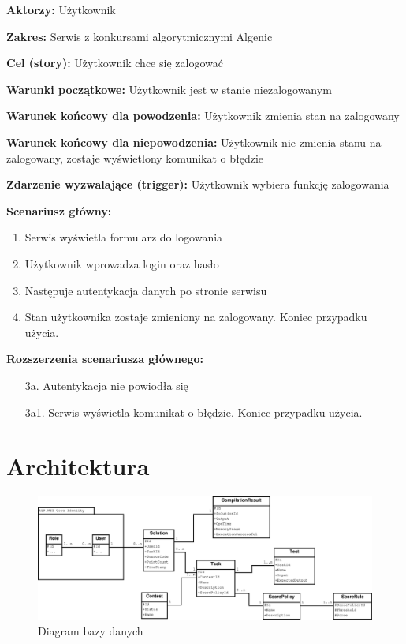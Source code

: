 \documentclass{article}
\begin{document}
\textbf{Aktorzy:} Użytkownik

\textbf{Zakres:} Serwis z konkursami algorytmicznymi Algenic

\textbf{Cel (story):} Użytkownik chce się zalogować

\textbf{Warunki początkowe:} Użytkownik jest w stanie niezalogowanym

\textbf{Warunek końcowy dla powodzenia:} Użytkownik zmienia stan na zalogowany

\textbf{Warunek końcowy dla niepowodzenia:} Użytkownik nie zmienia stanu na zalogowany, zostaje wyświetlony komunikat o błędzie

\textbf{Zdarzenie wyzwalające (trigger):} Użytkownik wybiera funkcję zalogowania

\textbf{Scenariusz główny:}
\begin{enumerate}
	\item Serwis wyświetla formularz do logowania
	\item Użytkownik wprowadza login oraz hasło
	\item Następuje autentykacja danych po stronie serwisu
	\item Stan użytkownika zostaje zmieniony na zalogowany. Koniec przypadku użycia.
\end{enumerate}

\textbf{Rozszerzenia scenariusza głównego:}
\begin{itemize}
	\item[3a.] Autentykacja nie powiodła się
	\item[3a1.] Serwis wyświetla komunikat o błędzie. Koniec przypadku użycia.
\end{itemize}

\newpage
\section{Architektura}

\begin{figure}[H]
	\includegraphics[width=\linewidth]{entityDiagram.eps}
	\caption{Diagram bazy danych}
\end{figure}
\end{document}
